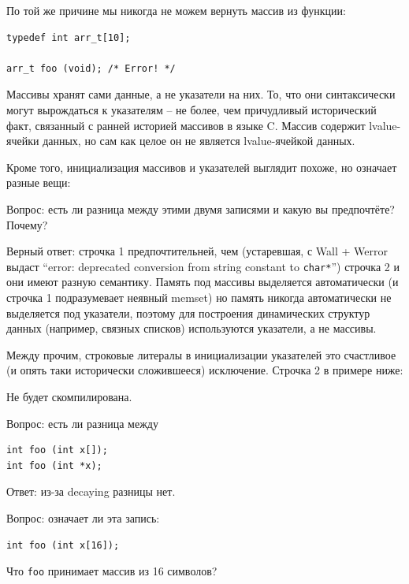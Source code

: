 \documentclass[a4paper,12pt,oneside]{article}
\begin{document}
По той же причине мы никогда не можем вернуть массив из функции:

\begin{lstlisting}
typedef int arr_t[10];

arr_t foo (void); /* Error! */
\end{lstlisting}

Массивы хранят сами данные, а не указатели на них. То, что они синтаксически могут вырождаться к указателям -- не более, чем причудливый исторический факт, связанный с ранней историей массивов в языке C. Массив содержит lvalue-ячейки данных, но сам как целое он не является lvalue-ячейкой данных.

Кроме того, инициализация массивов и указателей выглядит похоже, но означает разные вещи:



Вопрос: есть ли разница между этими двумя записями и какую вы предпочтёте? Почему?

Верный ответ: строчка 1 предпочтительней, чем (устаревшая, с Wall + Werror выдаст ``error: deprecated conversion from string constant to \lstinline!char*!'') строчка 2 и они имеют разную семантику. Память под массивы выделяется автоматически (и строчка 1 подразумевает неявный memset) но память никогда автоматически не выделяется под указатели, поэтому для построения динамических структур данных (например, связных списков) используются указатели, а не массивы.

Между прочим, строковые литералы в инициализации указателей это счастливое (и опять таки исторически сложившееся) исключение. Строчка 2 в примере ниже:



Не будет скомпилирована.

Вопрос: есть ли разница между

\begin{lstlisting}
int foo (int x[]);
int foo (int *x);
\end{lstlisting}

Ответ: из-за decaying разницы нет.

Вопрос: означает ли эта запись:

\begin{lstlisting}
int foo (int x[16]);
\end{lstlisting}

Что \lstinline!foo! принимает массив из 16 символов?
\end{document}
